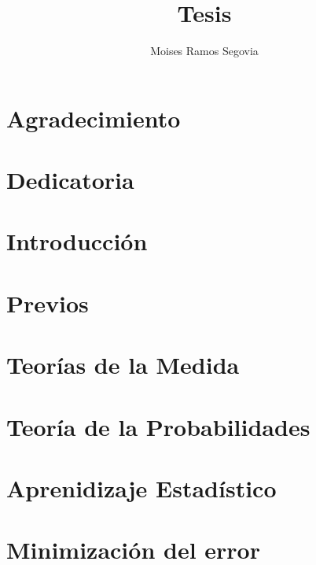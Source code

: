 \documentclass[12pt,a4paper,openany]{book}
\author{Moises Ramos Segovia}
\title{Tesis}
\begin{document}
	
	
	\chapter*{Agradecimiento}
	\lipsum[2]
	
	\chapter*{Dedicatoria}
	\lipsum[1]
	\chapter{Introducción}
	\lipsum
	
	\chapter{Previos}
	\lipsum \lipsum[3]
	
	\chapter{Teorías de la Medida}
	\lipsum \lipsum[2]
	
	\chapter{Teoría de la Probabilidades}
	\lipsum[5] \lipsum[4]
	
	\chapter{Aprenidizaje Estadístico}
	\lipsum \lipsum[1]
	
	\chapter{Minimización del error}
	\lipsum \lipsum[3]
	
\end{document}
